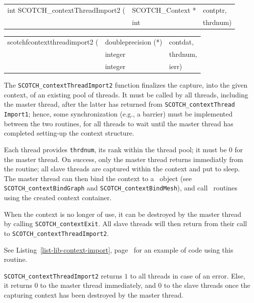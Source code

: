 \begin{itemize}
\progsyn

{\tt\begin{tabular}{l@{}ll}
int SCOTCH\_contextThreadImport2 ( & SCOTCH\_Context * & contptr, \\
                                   & int               & thrdnum)
\end{tabular}}

{\tt\begin{tabular}{l@{}ll}
scotchfcontextthreadimport2 ( & doubleprecision (*) & contdat, \\
                              & integer             & thrdnum, \\
                              & integer             & ierr)
\end{tabular}}

\progdes

The \texttt{SCOTCH\_contextThreadImport2} function finalizes the
capture, into the given context, of an existing pool of threads. It
must be called by all threads, including the master thread, after the
latter has returned from \texttt{SCOTCH\_\lbt context\lbt Thread\lbt
Import1}; hence, some synchronization (e.g., a barrier) must be
implemented between the two routines, for all threads to wait until
the master thread has completed setting-up the context structure.

Each thread provides \texttt{thrdnum}, its rank within the thread
pool; it must be $0$ for the master thread. On success, only the
master thread returns immediatly from the routine; all slave threads
are captured within the context and put to sleep. The master thread
can then bind the context to a \scotch\ object (see
\texttt{SCOTCH\_\lbt context\lbt Bind\lbt Graph} and
\texttt{SCOTCH\_\lbt context\lbt Bind\lbt Mesh}), and call
\libscotch\ routines using the created context container.

When the context is no longer of use, it can be destroyed by the
master thread by calling \texttt{SCOTCH\_\lbt context\lbt Exit}. All
slave threads will then return from their call to
\texttt{SCOTCH\_\lbt context\lbt Thread\lbt Import2}.

See Listing~\ref{list-lib-context-import},
page~\pageref{list-lib-context-import} for an example of code using
this routine.

\progret

\texttt{SCOTCH\_contextThreadImport2} returns $1$ to all threads in
case of an error. Else, it returns $0$ to the master thread
immediately, and $0$ to the slave threads once the capturing context
has been destroyed by the master thread.
\end{itemize}


